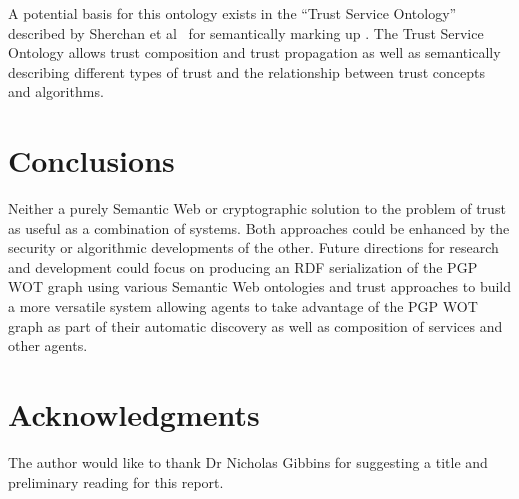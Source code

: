 \documentclass{acm_proc_article-sp}
\begin{document}
A potential basis for this ontology exists in the ``Trust Service Ontology'' described  by Sherchan et al~\cite{sherchan_trust_2010} for semantically marking up . The Trust Service Ontology  allows trust composition and trust propagation as well as semantically describing different types of trust and the relationship between trust concepts and algorithms.

\section{Conclusions}

Neither a purely Semantic Web or cryptographic solution to the problem of trust as useful as a combination of systems.  Both approaches could be enhanced by the security or algorithmic developments of the other.  Future directions for research and development could focus on producing an RDF serialization of the PGP WOT graph using various Semantic Web ontologies and trust approaches to build a more versatile system allowing agents to take advantage of the PGP WOT graph as part of their automatic discovery as well as composition of services and other agents.

\section{Acknowledgments}
The author would like to thank Dr Nicholas Gibbins for suggesting a title and preliminary reading for this report.

%


%
%
\end{document}
